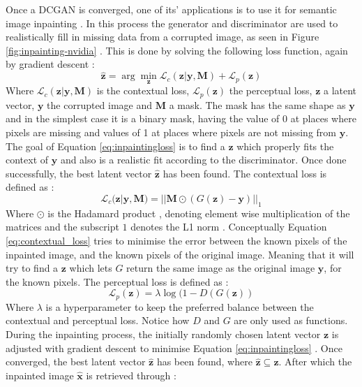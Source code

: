 Once a DCGAN is converged, one of its' applications is to use it for semantic image inpainting \cite{yeh2017semantic}. In this process the generator and discriminator are used to realistically fill in missing data from a corrupted image, as seen in Figure \ref{fig:inpainting-nvidia} . This is done by solving the following loss function, again by gradient descent \cite{yeh2017semantic}:
\begin{equation}
    \boldsymbol{\hat{z}} = \arg \min_{\boldsymbol{z}} {\mathcal{L}_c(\boldsymbol{z}|\boldsymbol{y},\boldsymbol{M}) + \mathcal{L}_p (\boldsymbol{z})}
    \label{eq:inpaintingloss}
\end{equation}
Where $\mathcal{L}_c(\boldsymbol{z}|\boldsymbol{y},\boldsymbol{M})$ is the contextual loss, $\mathcal{L}_p (\boldsymbol{z})$ the perceptual loss, $\boldsymbol{z}$ a latent vector, $\boldsymbol{y}$ the corrupted image and $\boldsymbol{M}$ a mask. The mask has the same shape as $\boldsymbol{y}$ and in the simplest case it is a binary mask, having the value of 0 at places where pixels are missing and values of 1 at places where pixels are not missing from $\boldsymbol{y}$. The goal of Equation \ref{eq:inpaintingloss} is to find a $\boldsymbol{z}$ which properly fits the context of $\boldsymbol{y}$ and also is a realistic fit according to the discriminator. Once done successfully, the best latent vector $\boldsymbol{\hat{z}}$ has been found. The contextual loss is defined as \cite{yeh2017semantic}:
\begin{equation}
    \mathcal{L}_c(\boldsymbol{z}|\boldsymbol{y},\boldsymbol{M}) = ||\boldsymbol{M} \odot (G(\boldsymbol{z})-\boldsymbol{y})||_1
    \label{eq:contextual_loss}
\end{equation}
Where $\odot$ is the Hadamard product \cite{horn1990hadamard}, denoting element wise multiplication of the matrices and the subscript $1$ denotes the L1 norm \cite{ng2004feature}. Conceptually Equation \ref{eq:contextual_loss} tries to minimise the error between the known pixels of the inpainted image, and the known pixels of the original image. Meaning that it will try to find a $\boldsymbol{z}$ which lets $G$ return the same image as the original image $\boldsymbol{y}$, for the known pixels. The perceptual loss is defined as \cite{yeh2017semantic}:
\begin{equation}
    \mathcal{L}_p (\boldsymbol{z}) = \lambda \log(1-D(G(\boldsymbol{z}))
\end{equation}
Where $\lambda$ is a hyperparameter to keep the preferred balance between the contextual and perceptual loss. Notice how $D$ and $G$ are only used as functions. During the inpainting process, the initially randomly chosen latent vector $\boldsymbol{z}$ is adjusted with gradient descent to minimise Equation \ref{eq:inpaintingloss} . Once converged, the best latent vector $\boldsymbol{\hat{z}}$ has been found, where $\boldsymbol{\hat{z}}  \subseteq \boldsymbol{z}$. After which the inpainted image $\boldsymbol{\hat{x}}$ is retrieved through \cite{yeh2017semantic}:

